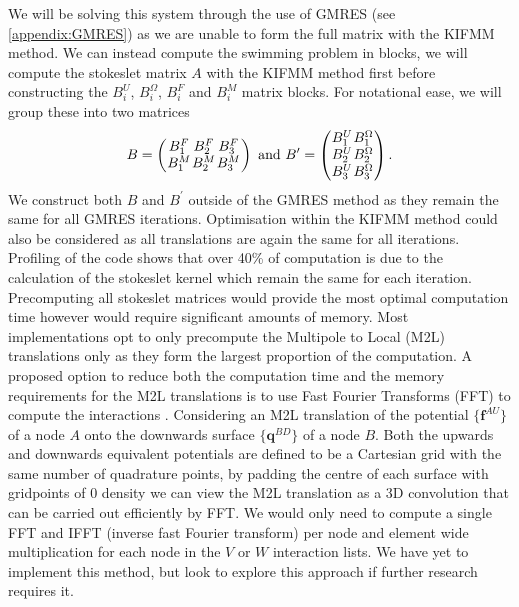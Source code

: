 We will be solving this system through the use of GMRES (see \cref{appendix:GMRES}) as we are unable to form the full matrix with the KIFMM method. We can instead compute the swimming problem in blocks, we will compute the stokeslet matrix $A$ with the KIFMM method first before constructing the $B_i^U$, $B_i^\Omega$, $B_i^F$ and $B_i^M$ matrix blocks. For notational ease, we will group these into two matrices
\begin{equation*}
\arraycolsep=0.4pt\def\arraystretch{1}
B = \left( \begin{array}{ccc}
B_{1}^{F} & B_{2}^{F} & B_{3}^{F} \\
B_{1}^{M} & B_{2}^{M} & B_{3}^{M}
\end{array}\right) \text{ and }
B^\prime = \left(\begin{array}{cc}
B_{1}^{U} & B_{1}^{\Omega} \\
B_{2}^{U} & B_{2}^{\Omega} \\
B_{3}^{U} & B_{3}^{\Omega} \\
\end{array}\right).
\end{equation*} 
We construct both $B$ and $B^\prime$ outside of the GMRES method as they remain the same for all GMRES iterations. Optimisation within the KIFMM method could also be considered as all translations are again the same for all iterations. Profiling of the code shows that over 40\% of computation is due to the calculation of the stokeslet kernel which remain the same for each iteration. Precomputing all stokeslet matrices would provide the most optimal computation time however would require significant amounts of memory. Most implementations opt to only precompute the Multipole to Local (M2L) translations only as they form the largest proportion of the computation. A proposed option to reduce both the computation time and the memory requirements for the M2L translations is to use Fast Fourier Transforms (FFT) to compute the interactions \cite{Ying2004}. Considering an M2L translation of the potential $\{\bm{f}^{AU}\}$ of a node $A$ onto the downwards surface $\{\bm{q}^{BD}\}$ of a node $B$. Both the upwards and downwards equivalent potentials are defined to be a Cartesian grid with the same number of quadrature points, by padding the centre of each surface with gridpoints of $0$ density we can view the M2L translation as a 3D convolution that can be carried out efficiently by FFT. We would only need to compute a single FFT and IFFT (inverse fast Fourier transform) per node and element wide multiplication for each node in the $V$ or $W$ interaction lists. We have yet to implement this method, but look to explore this approach if further research requires it.

